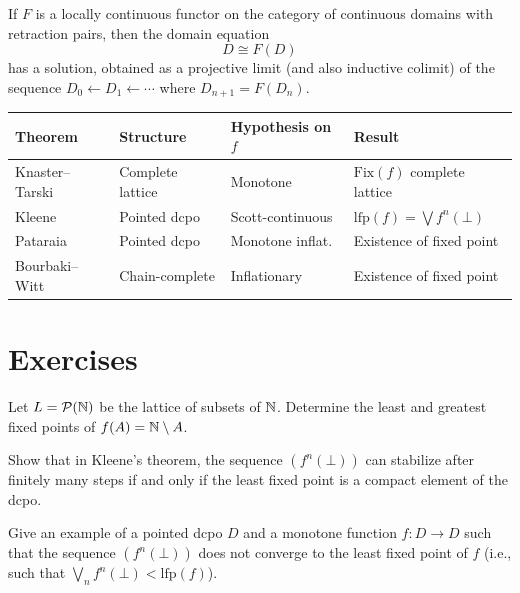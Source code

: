 \begin{theorem}
If $F$ is a locally continuous functor on the category of continuous domains with
retraction pairs, then the domain equation
\[
  D \cong F(D)
\]
has a solution, obtained as a projective limit (and also inductive colimit) of the
sequence $D_0 \leftarrow D_1 \leftarrow \cdots$ where $D_{n+1} = F(D_n)$.
\end{theorem}

\begin{keyformulas}[title=\textbf{Summary of fixed point theorems}]
\begin{center}
\renewcommand{\arraystretch}{1.3}
\begin{tabular}{|l|l|l|l|}
\hline
\textbf{Theorem} & \textbf{Structure} & \textbf{Hypothesis on $f$} & \textbf{Result} \\
\hline
Knaster--Tarski & Complete lattice & Monotone & $\mathrm{Fix}(f)$ complete lattice \\
Kleene & Pointed dcpo & Scott-continuous & $\mathrm{lfp}(f) = \bigvee f^n(\bot)$ \\
Pataraia & Pointed dcpo & Monotone inflat. & Existence of fixed point \\
Bourbaki--Witt & Chain-complete & Inflationary & Existence of fixed point \\
\hline
\end{tabular}
\end{center}
\end{keyformulas}

\section{Exercises}

\begin{exercise}
Let $L = \mathcal{P}(\mathbb{N})$ be the lattice of subsets of $\mathbb{N}$. Determine the least and
greatest fixed points of $f(A) = \mathbb{N} \setminus A$.
\end{exercise}

\begin{exercise}
Show that in Kleene's theorem, the sequence $(f^n(\bot))$ can stabilize after finitely
many steps if and only if the least fixed point is a compact element of the dcpo.
\end{exercise}

\begin{exercise}
Give an example of a pointed dcpo $D$ and a monotone function $f\colon D \to D$ such that
the sequence $(f^n(\bot))$ does not converge to the least fixed point of $f$ (i.e., such
that $\bigvee_n f^n(\bot) < \mathrm{lfp}(f)$).
\end{exercise}

